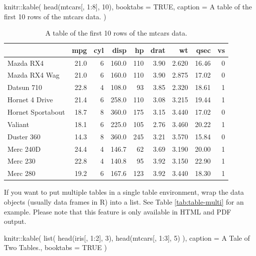 \documentclass[
]{book}
\newenvironment{Shaded}{\begin{snugshade}}{\end{snugshade}}
\newcommand{\AttributeTok}[1]{\textcolor[rgb]{0.77,0.63,0.00}{#1}}
\newcommand{\ConstantTok}[1]{\textcolor[rgb]{0.00,0.00,0.00}{#1}}
\newcommand{\DecValTok}[1]{\textcolor[rgb]{0.00,0.00,0.81}{#1}}
\newcommand{\FunctionTok}[1]{\textcolor[rgb]{0.00,0.00,0.00}{#1}}
\newcommand{\NormalTok}[1]{#1}
\newcommand{\SpecialCharTok}[1]{\textcolor[rgb]{0.00,0.00,0.00}{#1}}
\newcommand{\StringTok}[1]{\textcolor[rgb]{0.31,0.60,0.02}{#1}}
\theoremstyle{definition}
\theoremstyle{definition}
\theoremstyle{definition}
\theoremstyle{definition}
\theoremstyle{remark}
\begin{document}
\begin{Shaded}
\begin{Highlighting}[]
\NormalTok{knitr}\SpecialCharTok{::}\FunctionTok{kable}\NormalTok{(}
  \FunctionTok{head}\NormalTok{(mtcars[, }\DecValTok{1}\SpecialCharTok{:}\DecValTok{8}\NormalTok{], }\DecValTok{10}\NormalTok{), }\AttributeTok{booktabs =} \ConstantTok{TRUE}\NormalTok{,}
  \AttributeTok{caption =} \StringTok{\textquotesingle{}A table of the first 10 rows of the mtcars data.\textquotesingle{}}
\NormalTok{)}
\end{Highlighting}
\end{Shaded}

\begin{table}

\caption{\label{tab:table-single}A table of the first 10 rows of the mtcars data.}
\centering
\begin{tabular}[t]{lrrrrrrrr}
\toprule
  & mpg & cyl & disp & hp & drat & wt & qsec & vs\\
\midrule
Mazda RX4 & 21.0 & 6 & 160.0 & 110 & 3.90 & 2.620 & 16.46 & 0\\
Mazda RX4 Wag & 21.0 & 6 & 160.0 & 110 & 3.90 & 2.875 & 17.02 & 0\\
Datsun 710 & 22.8 & 4 & 108.0 & 93 & 3.85 & 2.320 & 18.61 & 1\\
Hornet 4 Drive & 21.4 & 6 & 258.0 & 110 & 3.08 & 3.215 & 19.44 & 1\\
Hornet Sportabout & 18.7 & 8 & 360.0 & 175 & 3.15 & 3.440 & 17.02 & 0\\
\addlinespace
Valiant & 18.1 & 6 & 225.0 & 105 & 2.76 & 3.460 & 20.22 & 1\\
Duster 360 & 14.3 & 8 & 360.0 & 245 & 3.21 & 3.570 & 15.84 & 0\\
Merc 240D & 24.4 & 4 & 146.7 & 62 & 3.69 & 3.190 & 20.00 & 1\\
Merc 230 & 22.8 & 4 & 140.8 & 95 & 3.92 & 3.150 & 22.90 & 1\\
Merc 280 & 19.2 & 6 & 167.6 & 123 & 3.92 & 3.440 & 18.30 & 1\\
\bottomrule
\end{tabular}
\end{table}

If you want to put multiple tables in a single table environment, wrap the data objects (usually data frames in R) into a list. See Table \ref{tab:table-multi} for an example. Please note that this feature is only available in HTML and PDF output.

\begin{Shaded}
\begin{Highlighting}[]
\NormalTok{knitr}\SpecialCharTok{::}\FunctionTok{kable}\NormalTok{(}
  \FunctionTok{list}\NormalTok{(}
    \FunctionTok{head}\NormalTok{(iris[, }\DecValTok{1}\SpecialCharTok{:}\DecValTok{2}\NormalTok{], }\DecValTok{3}\NormalTok{),}
    \FunctionTok{head}\NormalTok{(mtcars[, }\DecValTok{1}\SpecialCharTok{:}\DecValTok{3}\NormalTok{], }\DecValTok{5}\NormalTok{)}
\NormalTok{  ),}
  \AttributeTok{caption =} \StringTok{\textquotesingle{}A Tale of Two Tables.\textquotesingle{}}\NormalTok{, }\AttributeTok{booktabs =} \ConstantTok{TRUE}
\NormalTok{)}
\end{Highlighting}
\end{Shaded}
\end{document}
